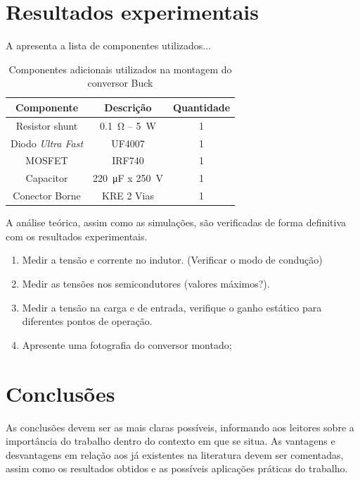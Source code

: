 \section{Resultados experimentais}


A  apresenta a lista de componentes utilizados...

\begin{table}[!ht]
	\centering
	\caption{Componentes adicionais utilizados na montagem do conversor Buck}
	\label{tab:componentesBuck}
	\begin{tabular}{@{}ccc@{}}
		\toprule
		\textbf{Componente} & \textbf{Descrição} & \textbf{Quantidade} \\ \midrule
		Resistor shunt      & \SI{0.1}{\ohm} -- \SI{5}{\W}             & 1                   \\
		Diodo \emph{Ultra Fast}           & UF4007             & 1                   \\
					MOSFET              & IRF740             & 1                   \\
		Capacitor           & \SI{220}{\micro\farad} x \SI{250}{\V}      & 1                   \\
		Conector Borne      &  KRE 2 Vias    & 1                   \\
		\bottomrule
	\end{tabular}
\end{table}



A análise teórica, assim como as simulações, são verificadas de forma definitiva com os resultados experimentais.
\begin{enumerate}									
	\item  Medir a tensão e corrente no indutor. (Verificar o modo de condução)
	\item  Medir as tensões nos semicondutores (valores máximos?).
	\item Medir a tensão na carga e de entrada, verifique o ganho estático para diferentes pontos de operação.
	\item  Apresente uma fotografia do conversor montado;
\end{enumerate}

\section{Conclusões} 


As conclusões devem ser as mais claras possíveis, informando aos leitores sobre a importância do trabalho dentro do contexto em que se situa. As vantagens e desvantagens em relação aos já existentes na literatura devem ser comentadas, assim como os resultados obtidos e as possíveis aplicações práticas do trabalho.





\balance


